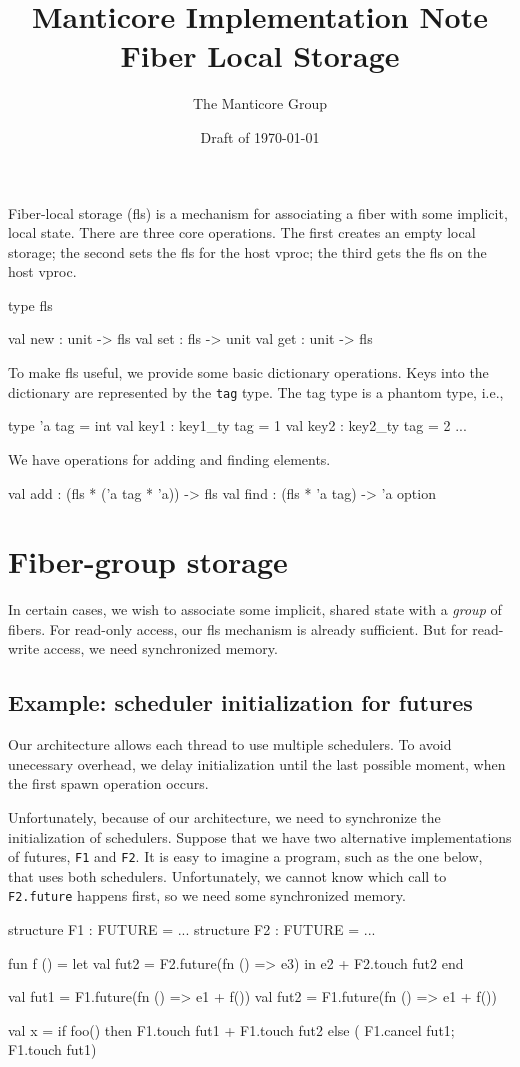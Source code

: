 \documentclass[11pt]{article}
\title{Manticore Implementation Note \\ Fiber Local Storage}
\author{The Manticore Group}
\date{Draft of \today}
\begin{document}
\maketitle

Fiber-local storage (fls) is a mechanism for associating a fiber with some implicit, local state. There are three core operations. The first creates an empty local storage; the second sets the fls for the host vproc; the third gets the fls on the host vproc.
\begin{centercode}
  type fls

  val new : unit -> fls
  val set : fls -> unit
  val get : unit -> fls
\end{centercode}

To make fls useful, we provide some basic dictionary operations. Keys into the dictionary are represented by the \texttt{tag} type. The tag type is a phantom type, i.e.,
\begin{centercode}
  type 'a tag = int
  val key1 : key1_ty tag = 1
  val key2 : key2_ty tag = 2
  ...
\end{centercode}
We have operations for adding and finding elements.
\begin{centercode}
  val add : (fls * ('a tag * 'a)) -> fls
  val find : (fls * 'a tag) -> 'a option
\end{centercode}

\section{Fiber-group storage}
In certain cases, we wish to associate some implicit, shared state with a \emph{group} of fibers. For read-only access, our fls mechanism is already sufficient. But for read-write access, we need synchronized memory.

\subsection{Example: scheduler initialization for futures}
Our architecture allows each thread to use multiple schedulers. To avoid unecessary overhead, we delay initialization until the last possible moment, when the first spawn operation occurs. 

Unfortunately, because of our architecture, we need to synchronize the initialization of schedulers. Suppose that we have two alternative implementations of futures, \texttt{F1} and \texttt{F2}. It is easy to imagine a program, such as the one below, that uses both schedulers. Unfortunately, we cannot know which call to \texttt{F2.future} happens first, so we need some synchronized memory.
\begin{centercode}
structure F1 : FUTURE = ...
structure F2 : FUTURE = ...

fun f () = let
    val fut2 = F2.future(fn () => e3)
    in
       e2 + F2.touch fut2
    end

val fut1 = F1.future(fn () => e1 + f())
val fut2 = F1.future(fn () => e1 + f())

val x = if foo()
	   then F1.touch fut1 + F1.touch fut2
	else ( F1.cancel fut1; F1.touch fut1)
\end{centercode}
\end{document}
